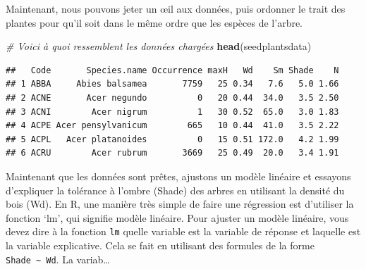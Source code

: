 \documentclass[
]{book}
\newenvironment{Shaded}{\begin{snugshade}}{\end{snugshade}}
\newcommand{\CommentTok}[1]{\textcolor[rgb]{0.56,0.35,0.01}{\textit{#1}}}
\newcommand{\FunctionTok}[1]{\textcolor[rgb]{0.13,0.29,0.53}{\textbf{#1}}}
\newcommand{\NormalTok}[1]{#1}
\newcommand{\OtherTok}[1]{\textcolor[rgb]{0.56,0.35,0.01}{#1}}
\newcommand{\SpecialCharTok}[1]{\textcolor[rgb]{0.81,0.36,0.00}{\textbf{#1}}}
\begin{document}
Maintenant, nous pouvons jeter un œil aux données, puis ordonner le trait des plantes pour qu'il soit dans le même ordre que les espèces de l'arbre.

\begin{Shaded}
\begin{Highlighting}[]
\CommentTok{\# Voici à quoi ressemblent les données chargées}
\FunctionTok{head}\NormalTok{(seedplantsdata)}
\end{Highlighting}
\end{Shaded}

\begin{verbatim}
##   Code       Species.name Occurrence maxH   Wd    Sm Shade    N
## 1 ABBA     Abies balsamea       7759   25 0.34   7.6   5.0 1.66
## 2 ACNE       Acer negundo          0   20 0.44  34.0   3.5 2.50
## 3 ACNI        Acer nigrum          1   30 0.52  65.0   3.0 1.83
## 4 ACPE Acer pensylvanicum        665   10 0.44  41.0   3.5 2.22
## 5 ACPL   Acer platanoides          0   15 0.51 172.0   4.2 1.99
## 6 ACRU        Acer rubrum       3669   25 0.49  20.0   3.4 1.91
\end{verbatim}

\begin{Shaded}
\end{Shaded}

Maintenant que les données sont prêtes, ajustons un modèle linéaire et essayons d'expliquer la tolérance à l'ombre (Shade) des arbres en utilisant la densité du bois (Wd). En R, une manière très simple de faire une régression est d'utiliser la fonction `lm', qui signifie modèle linéaire. Pour ajuster un modèle linéaire, vous devez dire à la fonction \texttt{lm} quelle variable est la variable de réponse et laquelle est la variable explicative. Cela se fait en utilisant des formules de la forme \texttt{Shade\ \textasciitilde{}\ Wd}. La variab\ldots{}
\end{document}
